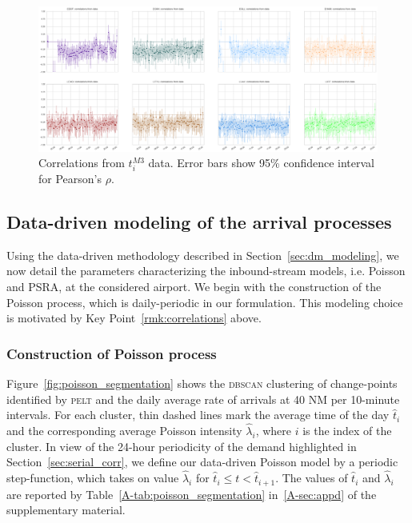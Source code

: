 \documentclass[]{elsarticle}
\makeatletter
\newcommand*{\ie}{i.e.\@\xspace}
\newcommand{\PELT}{\textsc{pelt}}
\newcommand{\DBSCAN}{\textsc{dbscan}}
\makeatother
\begin{document}
\begin{figure}
    \includegraphics[width=\textwidth]{correlations_true}
    \caption{Correlations from \(t^{M3}_i\) data. Error bars show 95\% confidence interval for Pearson's \(\rho\).}
    \label{fig:correlations_true}
\end{figure}

\subsection{Data-driven modeling of the arrival processes}\label{sec:modeling}

Using the data-driven methodology described in Section~\ref{sec:dm_modeling}, we now detail the parameters characterizing the inbound-stream models, \ie{} Poisson and \ac{PSRA}, at the considered airport.
We begin with the construction of the Poisson process, which is daily-periodic in our formulation.
This modeling choice is motivated by Key Point~\ref{rmk:correlations} above.

\subsubsection{Construction of Poisson process}\label{sec:pois}

Figure~\ref{fig:poisson_segmentation} shows the \DBSCAN{} clustering of change-points identified by \PELT{} and the daily average rate of arrivals at 40 NM per 10-minute  intervals.
For each cluster, thin dashed lines mark the average time of the day \(\hat{t}_i\) and the corresponding average Poisson intensity \(\hat{\lambda}_i\), where \(i\) is the index of the cluster.
In view of the 24-hour periodicity of the demand highlighted in Section~\ref{sec:serial_corr}, we define our data-driven Poisson model by a periodic step-function, which takes on value \(\hat{\lambda}_i\) for \(\hat{t}_i \leq t < \hat{t}_{i+1}\).
The values of \(\hat{t}_i\) and \(\hat{\lambda}_i\) are reported by Table~\ref{A-tab:poisson_segmentation} in~\ref{A-sec:appd} of the supplementary material.
\end{document}
